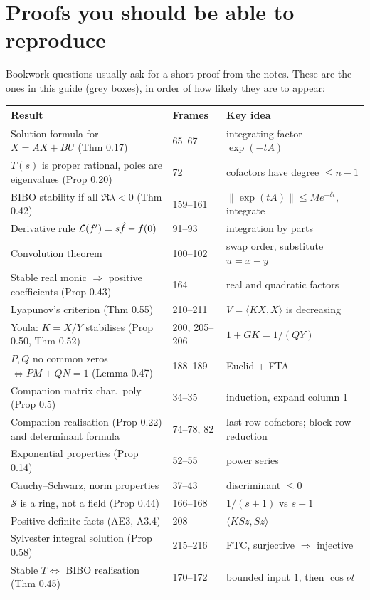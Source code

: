 \section{Proofs you should be able to reproduce}\label{sec:proofs}
Bookwork questions usually ask for a short proof from the notes. These are the ones in this guide (grey boxes), in order of how likely they are to appear:
\begin{center}
\renewcommand{\arraystretch}{1.25}
\begin{tabular}{@{}p{7.5cm}p{3cm}p{4.5cm}@{}}
\toprule
\textbf{Result} & \textbf{Frames} & \textbf{Key idea}\\\midrule
Solution formula for $\dot X=AX+BU$ (Thm 0.17) & 65--67 & integrating factor $\exp(-tA)$\\
$T(s)$ is proper rational, poles are eigenvalues (Prop 0.20) & 72 & cofactors have degree $\le n-1$\\
BIBO stability if all $\Re\lambda<0$ (Thm 0.42) & 159--161 & $\|\exp(tA)\|\le Me^{-\delta t}$, integrate\\
Derivative rule $\mathcal{L}(f')=s\hat f-f(0)$ & 91--93 & integration by parts\\
Convolution theorem & 100--102 & swap order, substitute $u=x-y$\\
Stable real monic $\Rightarrow$ positive coefficients (Prop 0.43) & 164 & real and quadratic factors\\
Lyapunov's criterion (Thm 0.55) & 210--211 & $V=\langle KX,X\rangle$ is decreasing\\
Youla: $K=X/Y$ stabilises (Prop 0.50, Thm 0.52) & 200, 205--206 & $1+GK=1/(QY)$\\
$P,Q$ no common zeros $\iff PM+QN=1$ (Lemma 0.47) & 188--189 & Euclid + FTA\\
Companion matrix char.\ poly (Prop 0.5) & 34--35 & induction, expand column 1\\
Companion realisation (Prop 0.22) and determinant formula & 74--78, 82 & last-row cofactors; block row reduction\\
Exponential properties (Prop 0.14) & 52--55 & power series\\
Cauchy--Schwarz, norm properties & 37--43 & discriminant $\le0$\\
$\mathcal S$ is a ring, not a field (Prop 0.44) & 166--168 & $1/(s+1)$ vs $s+1$\\
Positive definite facts (AE3, A3.4) & 208 & $\langle KSz,Sz\rangle$\\
Sylvester integral solution (Prop 0.58) & 215--216 & FTC, surjective $\Rightarrow$ injective\\
Stable $T\iff$ BIBO realisation (Thm 0.45) & 170--172 & bounded input $1$, then $\cos\nu t$\\
\bottomrule
\end{tabular}
\end{center}

